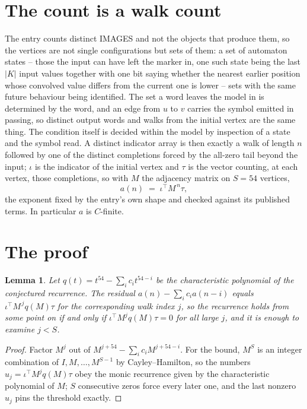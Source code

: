 \documentclass[11pt,a4paper]{article}
\theoremstyle{plain}
\newtheorem{lemma}[theorem]{Lemma}
\theoremstyle{definition}
\begin{document}
\section{The count is a walk count}

The entry counts distinct IMAGES and not the objects that produce them, so the vertices are not single configurations but sets of them: a set of automaton states -- those the input can have left the marker in, one such state being the last $|K|$ input values together with one bit saying whether the nearest earlier position whose convolved value differs from the current one is lower -- sets with the same future behaviour being identified. The set a word leaves the model in is determined by the word, and an edge from $u$ to $v$ carries the symbol emitted in passing, so distinct output words and walks from the initial vertex are the same thing. The condition itself is decided within the model by inspection of a state and the symbol read.
A distinct indicator array is then exactly a walk of length $n$ followed by one of the distinct completions forced by the all-zero tail beyond the input; $\iota$ is the indicator of the initial vertex and $\tau$ is the vector counting, at each vertex, those completions, so with $M$ the adjacency matrix on $S=54$ vertices,
\[
a(n)\;=\;\iota^{\!\top}M^{\,n}\tau ,
\]
the exponent fixed by the entry's own shape and checked against its published terms. In
particular $a$ is $C$-finite.

\section{The proof}

\begin{lemma}\label{lem:crit}
Let $q(t)=t^{54}-\sum_i c_it^{54-i}$ be the characteristic polynomial of the
conjectured recurrence. The residual $a(n)-\sum_ic_ia(n-i)$ equals
$\iota^{\!\top}M^{\,j}q(M)\tau$ for the corresponding walk index $j$, so the recurrence
holds from some point on if and only if $\iota^{\!\top}M^{j}q(M)\tau=0$ for all large $j$,
and it is enough to examine $j<S$.
\end{lemma}

\begin{proof}
Factor $M^{j}$ out of $M^{j+54}-\sum_ic_iM^{j+54-i}$. For the bound, $M^{S}$
is an integer combination of $I,M,\dots,M^{S-1}$ by Cayley--Hamilton, so the numbers
$u_j=\iota^{\!\top}M^{j}q(M)\tau$ obey the monic recurrence given by the characteristic
polynomial of $M$; $S$ consecutive zeros force every later one, and the last nonzero $u_j$
pins the threshold exactly.
\end{proof}
\end{document}
